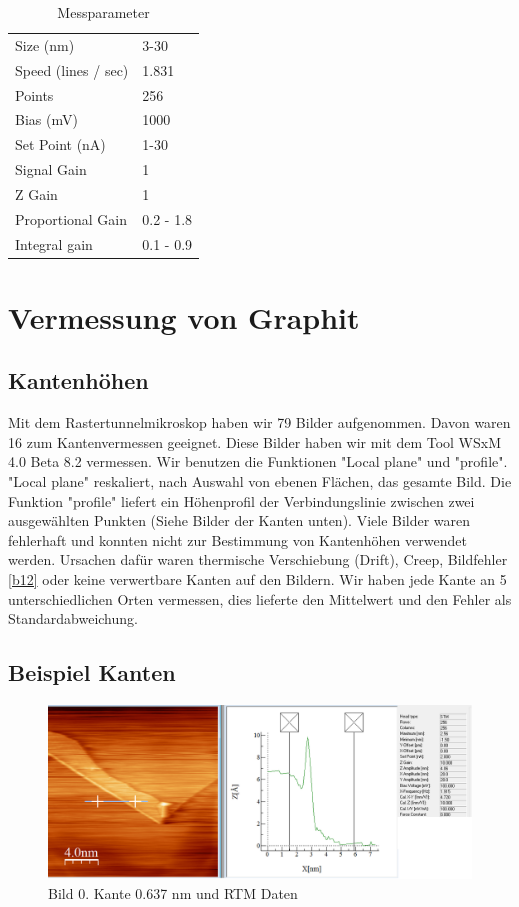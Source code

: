 \documentclass[10pt,a4paper]{article}
\begin{document}
\begin{table}[]
	\centering
	\caption{Messparameter}
	\label{Messparameter}
	\begin{tabular}{ll}
		Size (nm)           & 3-30      \\
		Speed (lines / sec) & 1.831     \\
		Points              & 256       \\
		Bias (mV)           & 1000      \\
		Set Point (nA)      & 1-30      \\
		Signal Gain         & 1         \\
		Z Gain              & 1         \\
		Proportional Gain   & 0.2 - 1.8 \\
		Integral gain       & 0.1 - 0.9
	\end{tabular}
\end{table}

\section{Vermessung von Graphit }

\subsection{ Kantenhöhen}

Mit dem Rastertunnelmikroskop haben wir 79 Bilder aufgenommen. Davon waren 16 zum Kantenvermessen geeignet.
Diese Bilder haben wir mit dem Tool WSxM 4.0 Beta 8.2 vermessen. 
Wir benutzen die Funktionen "Local plane" und "profile". "Local plane" reskaliert, nach Auswahl von ebenen Flächen, das gesamte Bild.  Die Funktion "profile" liefert ein Höhenprofil der Verbindungslinie zwischen zwei ausgewählten Punkten (Siehe Bilder der Kanten unten).
Viele Bilder waren fehlerhaft und konnten nicht zur Bestimmung von Kantenhöhen verwendet werden.
Ursachen dafür waren thermische Verschiebung (Drift), Creep, Bildfehler \ref{b12} oder keine verwertbare Kanten auf den Bildern. Wir haben jede Kante an 5 unterschiedlichen Orten vermessen, dies lieferte den Mittelwert und den Fehler als Standardabweichung.



\subsection{Beispiel Kanten}

\begin{figure}[]
	\includegraphics[scale = 0.3]{bild00.png}
	\centering
	\caption{Bild 0. Kante 0.637 nm und RTM Daten}
	\label{b0}
\end{figure}
\end{document}
